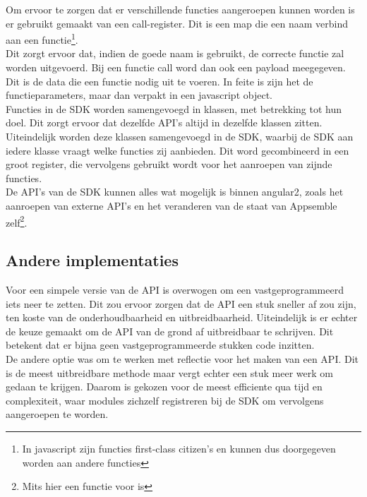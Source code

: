 Om ervoor te zorgen dat er verschillende functies aangeroepen kunnen worden is er gebruikt gemaakt van een call-register. Dit is een map die een naam verbind aan een functie\footnote{In javascript zijn functies first-class citizen's en kunnen dus doorgegeven worden aan andere functies}\cite{stack1}. \\

Dit zorgt ervoor dat, indien de goede naam is gebruikt, de correcte functie zal worden uitgevoerd. Bij een functie call word dan ook een payload meegegeven. Dit is de data die een functie nodig uit te voeren. In feite is zijn het de functieparameters, maar dan verpakt in een javascript object. \\

Functies in de SDK worden samengevoegd in klassen, met betrekking tot hun doel. Dit zorgt ervoor dat dezelfde API's altijd in dezelfde klassen zitten. \\

Uiteindelijk worden deze klassen samengevoegd in de SDK, waarbij de SDK aan iedere klasse vraagt welke functies zij aanbieden. Dit word gecombineerd in een groot register, die vervolgens gebruikt wordt voor het aanroepen van zijnde functies. \\

De API's van de SDK kunnen alles wat mogelijk is binnen angular2, zoals het aanroepen van externe API's en het veranderen van de staat van Appsemble zelf\footnote{Mits hier een functie voor is}. \\

\subsection{Andere implementaties}

Voor een simpele versie van de API is overwogen om een vastgeprogrammeerd iets neer te zetten. Dit zou ervoor zorgen dat de API een stuk sneller af zou zijn, ten koste van de onderhoudbaarheid en uitbreidbaarheid. Uiteindelijk is er echter de keuze gemaakt om de API van de grond af uitbreidbaar te schrijven. Dit betekent dat er bijna geen vastgeprogrammeerde stukken code inzitten. \\

De andere optie was om te werken met reflectie voor het maken van een API. Dit is de meest uitbreidbare methode maar vergt echter een stuk meer werk om gedaan te krijgen. Daarom is gekozen voor de meest efficiente qua tijd en complexiteit, waar modules zichzelf registreren bij de SDK om vervolgens aangeroepen te worden.

